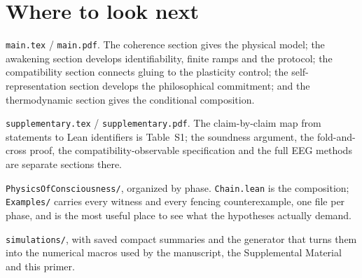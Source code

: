 \documentclass[11pt]{article}
\begin{document}
\section{Where to look next}

\begin{description}[leftmargin=*,style=nextline]
\item[The manuscript.] \texttt{main.tex} / \texttt{main.pdf}. The coherence
section gives the physical model; the awakening section develops identifiability,
finite ramps and the protocol; the compatibility section connects gluing to the
plasticity control; the self-representation section develops the philosophical
commitment; and the thermodynamic section gives the conditional composition.
\item[Supplemental Material.] \texttt{supplementary.tex} /
\texttt{supplementary.pdf}. The claim-by-claim map from statements to Lean
identifiers is Table~S1; the soundness argument, the fold-and-cross proof, the
compatibility-observable specification and the full EEG methods are separate
sections there.
\item[The Lean development.] \texttt{PhysicsOfConsciousness/}, organized by
phase. \texttt{Chain.lean} is the composition; \texttt{Examples/} carries every witness and every fencing counterexample, one file per phase, and is the most useful place to see what the hypotheses actually demand.
\item[Simulations.] \texttt{simulations/}, with saved compact summaries and the
generator that turns them into the numerical macros used by the manuscript,
the Supplemental Material and this primer.
\end{description}


\end{document}
